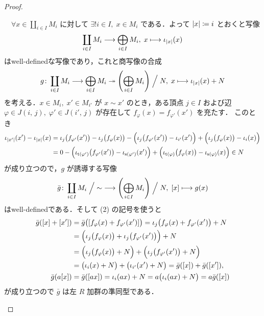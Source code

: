 \documentclass[algtopo_main]{subfiles}
\begin{document}
\begin{proof}
\begin{enumerate}
\begin{description}
			　$\forall x \in \coprod_{i \in I} M_i$ に対して $\exists ! i \in I,\; x \in M_i$ である．よって $\abs{x} \coloneqq i$ とおくと写像
			\begin{align}
				\coprod_{i \in I} M_i \longrightarrow \bigoplus_{i \in I} M_i,\; x \longmapsto \iota_{\abs{x}} (x)
			\end{align}
			はwell-definedな写像であり，これと商写像の合成
			\begin{align}
				g \colon \coprod_{i \in I} M_i \longrightarrow \bigoplus_{ i \in I} M_i \twoheadrightarrow \left( \bigoplus_{i \in I} M_i \right)\Bigm/ N,\; x \longmapsto \iota_{\abs{x}} (x) + N
			\end{align}
			を考える．$x \in M_i,\; x' \in M_{i'}$ が $x \sim x'$ のとき，ある頂点 $j \in I$ および辺 $\varphi \in J(i,\, j),\; \varphi' \in J(i',\, j)$ が存在して $f_{\varphi}(x) = f_{\varphi'}(x')$ を充たす．
			このとき
			\begin{align}
				\iota_{\abs{x'}} (x') - \iota_{\abs{x}} (x) &= \iota_j \bigl( f_{\varphi'} (x') \bigr) - \iota_j \bigl( f_\varphi (x) \bigr) - \Bigl( \iota_{j} \bigl( f_{\varphi'} (x') \bigr) - \iota_{i'} (x')\Bigr) + \Bigl( \iota_{j} \bigl( f_{\varphi} (x) \bigr) - \iota_{i} (x)\Bigr) \\
				&= 0 - \Bigl( \iota_{\mathrm{t}(\varphi')} \bigl( f_{\varphi'} (x') \bigr) - \iota_{\mathrm{s}(\varphi')} (x')\Bigr) + \Bigl( \iota_{\mathrm{t}(\varphi)} \bigl( f_{\varphi} (x) \bigr) - \iota_{\mathrm{s}(\varphi)} (x)\Bigr) \in N
			\end{align}
			が成り立つので，$g$ が誘導する写像
			\begin{align}
				\bar{g} \colon \coprod_{i \in I} M_i \Bigm/ {\sim} \longrightarrow \left( \bigoplus_{i \in I} M_i \right)\Bigm/ N,\; [x] \longmapsto g(x)
			\end{align}
			はwell-definedである．そして (2) の記号を使うと
			\begin{align}
				\bar{g} ([x] + [x']) &= \bar{g} \bigl( [f_\varphi (x) + f_{\varphi'} (x')] \bigr) = \iota_j \bigl( f_\varphi (x) + f_{\varphi'} (x') \bigr) + N \\
				&= \Bigl( \iota_j \bigl( f_\varphi (x) \bigr) + \iota_j \bigl( f_{\varphi'} (x') \bigr) \Bigr) + N \\
				&= \Bigl( \iota_j \bigl( f_\varphi (x) \bigr) + N \Bigr) + \Bigl( \iota_j \bigl( f_{\varphi'} (x') \bigr) + N \Bigr)  \\
				&= \bigl( \iota_i (x) + N \bigr) + \bigl( \iota_{i'}(x') + N \bigr) = \bar{g} ([x]) + \bar{g}([x']), \\
				\bar{g} (a[x]) &= \bar{g} ([ax]) = \iota_i (ax) + N = a \bigl(\iota_i (ax) + N\bigr) = a \bar{g} ([x])
			\end{align}
			が成り立つので $\bar{g}$ は左 $R$ 加群の準同型である．


\end{description}
\end{enumerate}
\end{proof}
\end{document}
